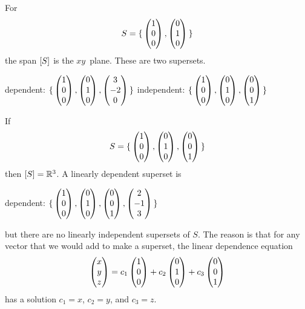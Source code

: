 \begin{example}
For
\begin{equation*}
  S
   =\mbox{$\{\,\begin{pmatrix} 1 \\ 0 \\ 0 \end{pmatrix},
          \begin{pmatrix} 0 \\ 1 \\ 0 \end{pmatrix}
                 \,\}$}
\end{equation*}
the span \( \relax [S\relax ] \) is the \( xy \)~plane.
These are two supersets.
\begin{center}
     dependent:
     \( \mbox{$\{\,
         \begin{pmatrix} 1 \\ 0 \\ 0 \end{pmatrix},
         \begin{pmatrix} 0 \\ 1 \\ 0 \end{pmatrix},
         \begin{pmatrix} 3 \\ -2 \\ 0 \end{pmatrix} \,\}$} \)       
     \qquad
     independent:
     \( \mbox{$\{\,
         \begin{pmatrix} 1 \\ 0 \\ 0 \end{pmatrix},
         \begin{pmatrix} 0 \\ 1 \\ 0 \end{pmatrix},
         \begin{pmatrix} 0 \\ 0 \\ 1 \end{pmatrix} \,\}$} \)    
\end{center}

If
\begin{equation*}
   S =\mbox{$\{\,\begin{pmatrix} 1 \\ 0 \\ 0 \end{pmatrix},
          \begin{pmatrix} 0 \\ 1 \\ 0 \end{pmatrix},
          \begin{pmatrix} 0 \\ 0 \\ 1 \end{pmatrix}        \,\}$} 
\end{equation*}
then \( \relax [S\relax ]=\mathbb{R}^3 \).
A linearly dependent superset is 
\begin{center}
     dependent:
     \( \mbox{$\{\,
         \begin{pmatrix} 1 \\ 0 \\ 0 \end{pmatrix},
         \begin{pmatrix} 0 \\ 1 \\ 0 \end{pmatrix},
         \begin{pmatrix} 0 \\ 0 \\ 1 \end{pmatrix},
         \begin{pmatrix} 2 \\ -1 \\ 3 \end{pmatrix} \,\}$} \)     
\end{center}
but there are no linearly independent supersets of $S$.
The reason is that for any vector that we would add to make a
superset, the linear dependence equation
\begin{equation*}
  \begin{pmatrix} x \\ y \\ z \end{pmatrix}
  =c_1\begin{pmatrix} 1 \\ 0 \\ 0 \end{pmatrix}
   +c_2\begin{pmatrix} 0 \\ 1 \\ 0 \end{pmatrix}
   +c_3\begin{pmatrix} 0 \\ 0 \\ 1 \end{pmatrix}
\end{equation*}
has a solution $c_1=x$, $c_2=y$, and $c_3=z$.
\end{example}

